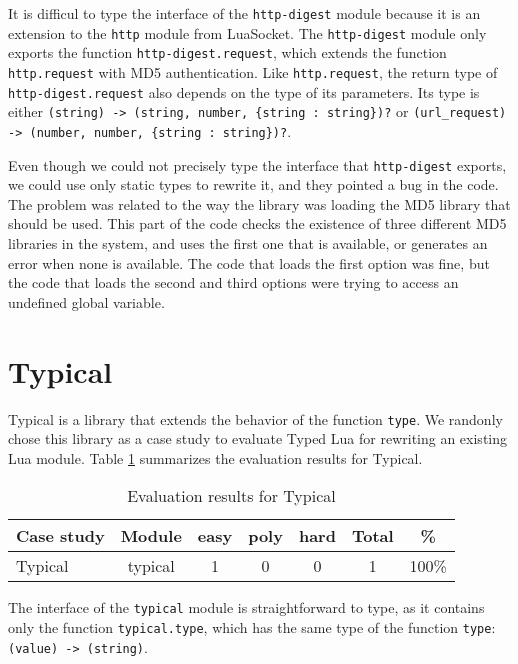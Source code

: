 It is difficul to type the interface of the \texttt{http-digest} module
because it is an extension to the \texttt{http} module from LuaSocket.
The \texttt{http-digest} module only exports the function
\texttt{http-digest.request}, which extends the function
\texttt{http.request} with MD5 authentication.
Like \texttt{http.request}, the return type of \texttt{http-digest.request}
also depends on the type of its parameters.
Its type is either
\texttt{(string) -> (string, number, \{string : string\})?} or
\texttt{(url\string_request) -> (number, number, \{string : string\})?}.

Even though we could not precisely type the interface that \texttt{http-digest}
exports, we could use only static types to rewrite it, and they pointed a bug
in the code.
The problem was related to the way the library was loading the MD5 library
that should be used. 
This part of the code checks the existence of three different MD5 libraries
in the system, and uses the first one that is available, or generates an
error when none is available.
The code that loads the first option was fine, but the code that loads the
second and third options were trying to access an undefined global variable.

\section{Typical}

Typical \citep{luatypical} is a library that extends the behavior of the
function \texttt{type}. 
We randonly chose this library as a case study to evaluate Typed Lua
for rewriting an existing Lua module.
Table \ref{tab:evaltypical} summarizes the evaluation results for Typical.

\begin{table}[!ht]
\begin{center}
\begin{tabular}{|l|c|c|c|c|c|c|}
\hline
\textbf{Case study} & \textbf{Module} & \textbf{easy} & \textbf{poly} & \textbf{hard} & \textbf{Total} & \textbf{\%} \\
\hline
\multirow{1}{*}{Typical}
& typical & 1 & 0 & 0 & 1 & 100\% \\
\hline
\end{tabular}
\end{center}
\caption{Evaluation results for Typical}
\label{tab:evaltypical}
\end{table}

The interface of the \texttt{typical} module is straightforward to type,
as it contains only the function \texttt{typical.type},
which has the same type of the function \texttt{type}: \texttt{(value) -> (string)}.

